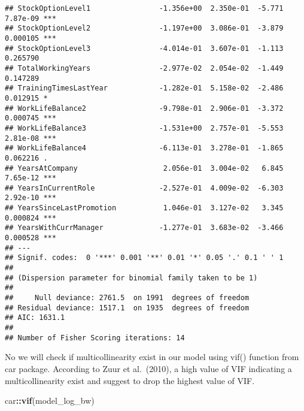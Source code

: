 \documentclass[
]{article}
\newenvironment{Shaded}{\begin{snugshade}}{\end{snugshade}}
\newcommand{\KeywordTok}[1]{\textcolor[rgb]{0.13,0.29,0.53}{\textbf{#1}}}
\newcommand{\NormalTok}[1]{#1}
\newcommand{\OperatorTok}[1]{\textcolor[rgb]{0.81,0.36,0.00}{\textbf{#1}}}
\begin{document}
\begin{verbatim}
## StockOptionLevel1                -1.356e+00  2.350e-01  -5.771 7.87e-09 ***
## StockOptionLevel2                -1.197e+00  3.086e-01  -3.879 0.000105 ***
## StockOptionLevel3                -4.014e-01  3.607e-01  -1.113 0.265790    
## TotalWorkingYears                -2.977e-02  2.054e-02  -1.449 0.147289    
## TrainingTimesLastYear            -1.282e-01  5.158e-02  -2.486 0.012915 *  
## WorkLifeBalance2                 -9.798e-01  2.906e-01  -3.372 0.000745 ***
## WorkLifeBalance3                 -1.531e+00  2.757e-01  -5.553 2.81e-08 ***
## WorkLifeBalance4                 -6.113e-01  3.278e-01  -1.865 0.062216 .  
## YearsAtCompany                    2.056e-01  3.004e-02   6.845 7.65e-12 ***
## YearsInCurrentRole               -2.527e-01  4.009e-02  -6.303 2.92e-10 ***
## YearsSinceLastPromotion           1.046e-01  3.127e-02   3.345 0.000824 ***
## YearsWithCurrManager             -1.277e-01  3.683e-02  -3.466 0.000528 ***
## ---
## Signif. codes:  0 '***' 0.001 '**' 0.01 '*' 0.05 '.' 0.1 ' ' 1
## 
## (Dispersion parameter for binomial family taken to be 1)
## 
##     Null deviance: 2761.5  on 1991  degrees of freedom
## Residual deviance: 1517.1  on 1935  degrees of freedom
## AIC: 1631.1
## 
## Number of Fisher Scoring iterations: 14
\end{verbatim}

No we will check if multicollinearity exist in our model using vif()
function from car package. According to Zuur et al.~(2010), a high value
of VIF indicating a multicollinearity exist and suggest to drop the
highest value of VIF.

\begin{Shaded}
\begin{Highlighting}[]
\NormalTok{car}\OperatorTok{::}\KeywordTok{vif}\NormalTok{(model_log_bw)}
\end{Highlighting}
\end{Shaded}
\end{document}
